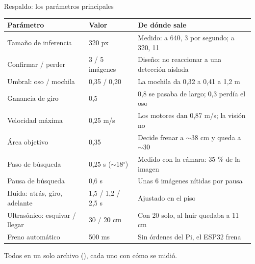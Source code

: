 \documentclass[aspectratio=169,11pt]{beamer}
\newcommand{\grad}{\ensuremath{^\circ}}
\newcommand{\cod}[1]{\texttt{\detokenize{#1}}}
\begin{document}
\begin{frame}{Respaldo: los parámetros principales}
  \footnotesize
  \begin{tabular}{L{4.1cm}L{2.4cm}L{6.7cm}}
    \toprule
    \textbf{Parámetro} & \textbf{Valor} & \textbf{De dónde sale} \\
    \midrule
    Tamaño de inferencia & 320 px & Medido: a 640, 3 por segundo; a 320, 11 \\
    Confirmar / perder & 3 / 5 imágenes & Diseño: no reaccionar a una detección aislada \\
    Umbral: oso / mochila & 0,35 / 0,20 & La mochila da 0,32 a 0,41 a 1,2 m \\
    Ganancia de giro & 0,5 & 0,8 se pasaba de largo; 0,3 perdía el oso \\
    Velocidad máxima & 0,25 m/s & Los motores dan 0,87 m/s; la visión no \\
    Área objetivo & 0,35 & Decide frenar a $\sim$38 cm y queda a $\sim$30 \\
    Paso de búsqueda & 0,25 s ($\sim$18\grad) & Medido con la cámara: 35 \% de la imagen \\
    Pausa de búsqueda & 0,6 s & Unas 6 imágenes nítidas por pausa \\
    Huida: atrás, giro, adelante & 1,5 / 1,2 / 2,5 s & Ajustado en el piso \\
    Ultrasónico: esquivar / llegar & 30 / 20 cm & Con 20 solo, al huir quedaba a 11 cm \\
    Freno automático & 500 ms & Sin órdenes del Pi, el ESP32 frena \\
    \bottomrule
  \end{tabular}

  \vspace{0.3em}
  Todos en un solo archivo (\cod{config.py}), cada uno con cómo se midió.
\end{frame}
\end{document}
